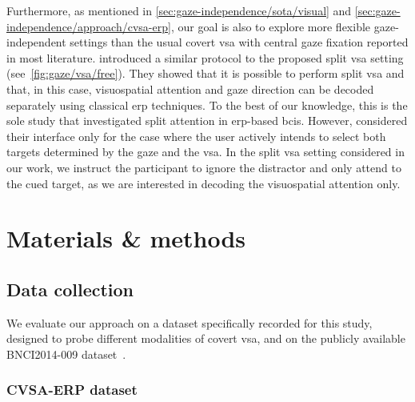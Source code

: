 Furthermore, as mentioned in \cref{sec:gaze-independence/sota/visual} and
\cref{sec:gaze-independence/approach/cvsa-erp},
our goal is also to explore more flexible gaze-independent settings than the
usual covert \ac{vsa} with central gaze fixation reported in most literature.
\textcite{Frenzel2011} introduced a similar protocol to the proposed split
\ac{vsa} setting (see~\cref{fig:gaze/vsa/free}).
They showed that it is possible to perform split \ac{vsa} and that, in this
case, visuospatial attention and gaze direction can be decoded separately using
classical \ac{erp} techniques.
To the best of our
knowledge, this is the sole study that investigated split attention in \ac{erp}-based \acp{bci}.
However, \textcite{Frenzel2011} considered their interface only for the case
where the user actively intends to select both targets determined by the gaze
and the \ac{vsa}.
In the split \ac{vsa} setting considered in our work, we instruct the participant to ignore
the distractor and only attend to the cued target, as we are interested in
decoding the visuospatial attention only.

\section{Materials \& methods}

\subsection{Data collection}
We evaluate our approach on a dataset specifically recorded for this study, designed to
probe different modalities of covert \ac{vsa}, and on the publicly available
BNCI2014-009 dataset~\cite{Aloise2012a}.

\subsubsection{CVSA-ERP dataset}
\label{sec:covert-align/stimulation}

